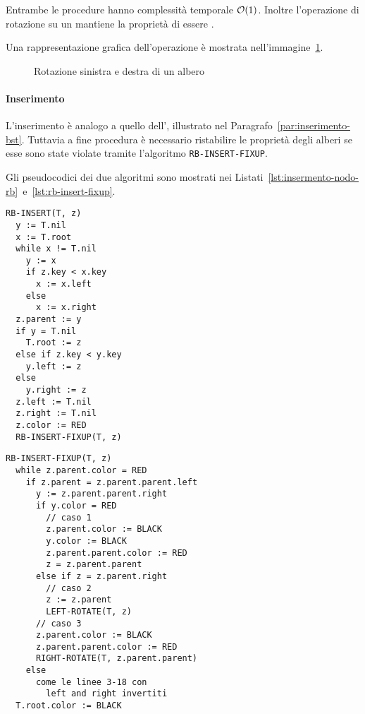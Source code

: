 \documentclass[italian, 10pt]{article}
\begin{document}
\bigskip
Entrambe le procedure hanno complessità temporale \(\mathcal{O}(1)\).
Inoltre l'operazione di rotazione su un \BST mantiene la proprietà di essere \BST.

\bigskip
Una rappresentazione grafica dell'operazione è mostrata nell'immagine~\ref{fig:rotazione-sinistra-destra-rb}.

\begin{figure}[htbp]
  \bigskip
  \centering
  \caption{Rotazione sinistra e destra di un albero \RB}
  \label{fig:rotazione-sinistra-destra-rb}
  \bigskip
\end{figure}

\paragraph{Inserimento}
\label{par:inserimento-rb}

L'inserimento è analogo a quello dell'\BST, illustrato nel Paragrafo~\ref{par:inserimento-bst}.
Tuttavia a fine procedura è necessario ristabilire le proprietà degli alberi \RB se esse sono state violate tramite l'algoritmo \texttt{RB-INSERT-FIXUP}.

\bigskip
Gli pseudocodici dei due algoritmi sono mostrati nei Listati~\ref{lst:insermento-nodo-rb}~e~\ref{lst:rb-insert-fixup}.

\begin{minipage}[t]{0.445\textwidth}
  \begin{lstlisting}[style=pseudocode, caption={Inserimento in un RB}, label={lst:insermento-nodo-rb}]
RB-INSERT(T, z)
  y := T.nil
  x := T.root
  while x != T.nil
    y := x
    if z.key < x.key
      x := x.left
    else
      x := x.right
  z.parent := y
  if y = T.nil
    T.root := z
  else if z.key < y.key
    y.left := z
  else
    y.right := z
  z.left := T.nil
  z.right := T.nil
  z.color := RED
  RB-INSERT-FIXUP(T, z)
\end{lstlisting}
\end{minipage}
\begin{minipage}[t]{0.55\textwidth}
  \begin{lstlisting}[style=pseudocode, caption={Fixup dopo inserimento}, label={lst:rb-insert-fixup}]
RB-INSERT-FIXUP(T, z)
  while z.parent.color = RED
    if z.parent = z.parent.parent.left
      y := z.parent.parent.right
      if y.color = RED
        // caso 1
        z.parent.color := BLACK
        y.color := BLACK
        z.parent.parent.color := RED
        z = z.parent.parent
      else if z = z.parent.right
        // caso 2
        z := z.parent
        LEFT-ROTATE(T, z)
      // caso 3
      z.parent.color := BLACK
      z.parent.parent.color := RED
      RIGHT-ROTATE(T, z.parent.parent)
    else
      come le linee 3-18 con
        left and right invertiti
  T.root.color := BLACK
  \end{lstlisting}
\end{minipage}
\end{document}
